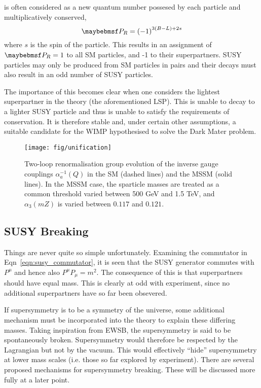 \Rparity is often considered as a new quantum number possesed by each particle
and multiplicatively conserved,
\begin{equation}
\PR = \left(-1\right)^{3(B-L)+2s}
\end{equation}
where $s$ is the spin of the particle. This results in an assignment of $\PR =
1$ to all \ac{SM} particles, and -1 to their superpartners. \ac{SUSY} particles
may only be produced from \ac{SM} particles in pairs and their decays must also
result in an odd number of \ac{SUSY} particles.

The importance of this becomes clear when one considers the lightest
superpartner in the theory (the aforementioned \ac{LSP}). This is unable to
decay to a lighter \ac{SUSY} particle and thus is unable to satisfy the
requirements of \Rparity conservation. It is therefore stable and, under certain
other assumptions, a suitable candidate for the \ac{WIMP} hypothesised to solve
the Dark Mater problem.

\begin{figure}
\centering
\texttt{[image: fig/unification]}
\caption{Two-loop renormalisation group evolution of the inverse gauge
  couplings $\alpha_a^{−1}(Q)$ in the \ac{SM} (dashed lines) and the MSSM (solid
  lines). In the MSSM case, the sparticle masses are treated as a common
  threshold varied between 500 GeV and 1.5 TeV, and $\alpha_3(mZ)$ is varied between
  $0.117$ and $0.121$. \cite{susy_primer}}
\label{fig:susy_gauge_unification}
\end{figure}

\subsection{\ac{SUSY} Breaking}
Things are never quite so simple unfortunately. Examining the commutator in
Eqn~\ref{eqn:susy_commutator}, it is seen that the \ac{SUSY} generator \Qa
commutes with $P^{\mu}$ and hence also $P^{\mu}P_{\mu} = m^2$. The consequence
of this is that superpartners should have equal mass. This is clearly at odd
with experiment, since no additional superpartners have so far been
obsevered.

If supersymmetry is to be a symmetry of the universe, some additional mechanism
must be incorporated into the theory to explain these differing masses. Taking
inspiration from \ac{EWSB}, the supersymmetry is said to be spontaneously
broken. Supersymmetry would therefore be respected by the Lagrangian but not by
the vacuum. This would effectively ``hide'' supersymmetry at lower mass scales
(i.e. those so far explored by experiment). There are several proposed
mechanisms for supersymmetry breaking. These will be discussed more fully at a
later point.

